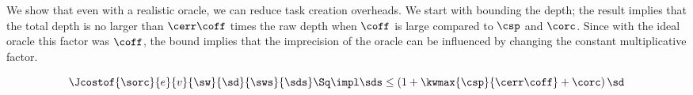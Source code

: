 We show that even with a realistic oracle, we can reduce task creation
overheads.  We start with bounding the depth; the result implies that
the total depth is no larger than $\cerr\coff$ times the raw depth
when $\coff$ is large compared to $\csp$ and $\corc$.  Since with the
ideal oracle this factor was $\coff$, the bound implies that the
imprecision of the oracle can be influenced by changing the
constant multiplicative factor.

\begin{theorem}
\label{thm:orc-cost-depth}
\label{thm:real-orc-depth}
$$\Jcostof{\sorc}{ e }{v}{\sw}{\sd}{\sws}{\sds} \Sq\impl \sds \leq (1+\kwmax{\csp}{\cerr\coff}+\corc)\,\sd$$
\end{theorem}
